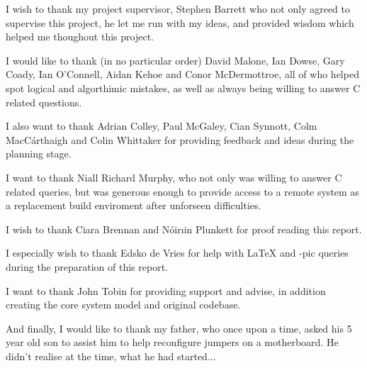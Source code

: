 
I wish to thank my project supervisor, Stephen Barrett who not only
agreed to supervise this project, he let me run with my ideas, and 
provided wisdom which helped me thoughout this project.

\vspace{5mm}

I would like to thank (in no particular order) David Malone, 
Ian Dowse, Gary Coady, Ian O'Connell, Aidan Kehoe and 
Conor McDermottroe, all of who helped spot logical and algorthimic 
mistakes, as well as always being willing to answer C related 
questions.


I also want to thank Adrian Colley, Paul McGaley, Cian Synnott, Colm
MacC\'{a}rthaigh and Colin Whittaker for providing feedback and ideas 
during the planning stage.


I want to thank Niall Richard Murphy, who not only was willing to answer
C related queries, but was generous enough to provide access to a remote
system as a replacement build enviroment after unforseen difficulties.

\vspace{5mm}

I wish to thank Ciara Brennan and N\'{o}ir\i{i}n Plunkett for proof
reading this report. 


I especially wish to thank Edsko de Vries for help with \LaTeX{} 
and \Xy-pic queries during the preparation of this report.

\vspace{5mm}

I want to thank John Tobin for providing support and advise, in 
addition creating the core system model and original codebase.

\vspace{5mm}

And finally, I would like to thank my father, who once upon a time, 
asked his 5 year old son to assist him to help reconfigure jumpers on
a motherboard. He didn't realise at the time, what he had started...
